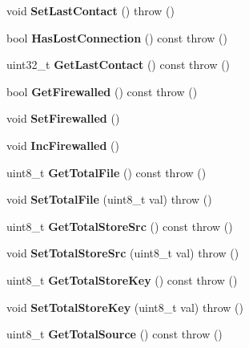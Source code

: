 \begin{DoxyCompactItemize}
\item 
void {\bfseries SetLastContact} ()  throw ()\label{classKademlia_1_1CPrefs_adde507e905afa8b7b59dd0ffa5f3ecdd}

\item 
bool {\bfseries HasLostConnection} () const   throw ()\label{classKademlia_1_1CPrefs_a99b90701d352f0b418bb9fd5cbf83157}

\item 
uint32\_\-t {\bfseries GetLastContact} () const   throw ()\label{classKademlia_1_1CPrefs_a4b440e79f2a39b0de401ba9a113d5e38}

\item 
bool {\bfseries GetFirewalled} () const   throw ()\label{classKademlia_1_1CPrefs_aedb23955d4f3d806f6c82169f435aed0}

\item 
void {\bfseries SetFirewalled} ()\label{classKademlia_1_1CPrefs_a2daaf67b47eead5ac178f24e50d1b6a7}

\item 
void {\bfseries IncFirewalled} ()\label{classKademlia_1_1CPrefs_ab79f19215c37dc1bb250191e6a3cdf02}

\item 
uint8\_\-t {\bfseries GetTotalFile} () const   throw ()\label{classKademlia_1_1CPrefs_aef34540a4de6bb49360e586a97d1ddcb}

\item 
void {\bfseries SetTotalFile} (uint8\_\-t val)  throw ()\label{classKademlia_1_1CPrefs_a76c529a925ee828e4119e3e743a93251}

\item 
uint8\_\-t {\bfseries GetTotalStoreSrc} () const   throw ()\label{classKademlia_1_1CPrefs_af7acb0eacebc7a690cfd352632f6bba2}

\item 
void {\bfseries SetTotalStoreSrc} (uint8\_\-t val)  throw ()\label{classKademlia_1_1CPrefs_a3e3726e4d98f138b27bb7b51b267ff00}

\item 
uint8\_\-t {\bfseries GetTotalStoreKey} () const   throw ()\label{classKademlia_1_1CPrefs_ac9acc4217af0efa91dac21b5c40a897e}

\item 
void {\bfseries SetTotalStoreKey} (uint8\_\-t val)  throw ()\label{classKademlia_1_1CPrefs_a38e5d30673ba31fe20259069c92fe624}

\item 
uint8\_\-t {\bfseries GetTotalSource} () const   throw ()\label{classKademlia_1_1CPrefs_a08cc8d739ea958a32f24b52bd91dc90c}


\end{DoxyCompactItemize}
